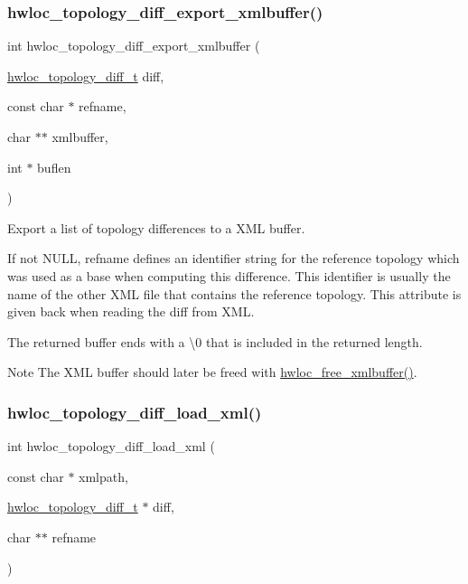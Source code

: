 \subsubsection{\texorpdfstring{hwloc\+\_\+topology\+\_\+diff\+\_\+export\+\_\+xmlbuffer()}{hwloc\_topology\_diff\_export\_xmlbuffer()}}
{\footnotesize\ttfamily int hwloc\+\_\+topology\+\_\+diff\+\_\+export\+\_\+xmlbuffer (\begin{DoxyParamCaption}\item[{\hyperlink{a00225_ga2cf1b17332fe5d95f2198f6340cfd288}{hwloc\+\_\+topology\+\_\+diff\+\_\+t}}]{diff,  }\item[{const char $\ast$}]{refname,  }\item[{char $\ast$$\ast$}]{xmlbuffer,  }\item[{int $\ast$}]{buflen }\end{DoxyParamCaption})}



Export a list of topology differences to a X\+ML buffer. 

If not {\ttfamily N\+U\+LL}, {\ttfamily refname} defines an identifier string for the reference topology which was used as a base when computing this difference. This identifier is usually the name of the other X\+ML file that contains the reference topology. This attribute is given back when reading the diff from X\+ML.

The returned buffer ends with a \textbackslash{}0 that is included in the returned length.

\begin{DoxyNote}{Note}
The X\+ML buffer should later be freed with \hyperlink{a00206_ga293e4a6489f15fd16ad22a5734561cf1}{hwloc\+\_\+free\+\_\+xmlbuffer()}. 
\end{DoxyNote}
\mbox{\label{a00225_ga2cd902ce8766e90d4f2523a8e87640e9}} 
\subsubsection{\texorpdfstring{hwloc\+\_\+topology\+\_\+diff\+\_\+load\+\_\+xml()}{hwloc\_topology\_diff\_load\_xml()}}
{\footnotesize\ttfamily int hwloc\+\_\+topology\+\_\+diff\+\_\+load\+\_\+xml (\begin{DoxyParamCaption}\item[{const char $\ast$}]{xmlpath,  }\item[{\hyperlink{a00225_ga2cf1b17332fe5d95f2198f6340cfd288}{hwloc\+\_\+topology\+\_\+diff\+\_\+t} $\ast$}]{diff,  }\item[{char $\ast$$\ast$}]{refname }\end{DoxyParamCaption})}




